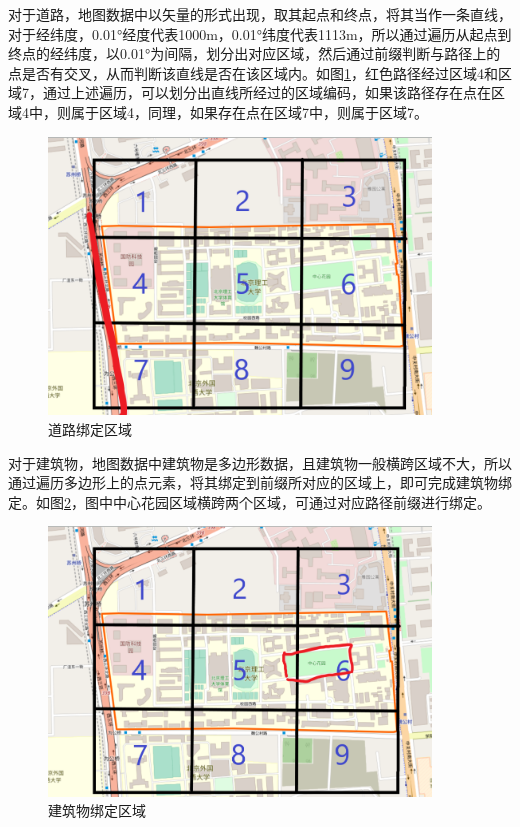 对于道路，地图数据中以矢量的形式出现，取其起点和终点，将其当作一条直线，对于经纬度，0.01°经度代表1000m，0.01°纬度代表1113m，所以通过遍历从起点到终点的经纬度，以0.01°为间隔，划分出对应区域，然后通过前缀判断与路径上的点是否有交叉，从而判断该直线是否在该区域内。如图\ref{道路绑定区域}，红色路径经过区域4和区域7，通过上述遍历，可以划分出直线所经过的区域编码，如果该路径存在点在区域4中，则属于区域4，同理，如果存在点在区域7中，则属于区域7。
\begin{figure}[H]
    \centering
    \includegraphics[width=4in]{images/4.png}
    \caption{道路绑定区域}\label{道路绑定区域} %
  \end{figure}

对于建筑物，地图数据中建筑物是多边形数据，且建筑物一般横跨区域不大，所以通过遍历多边形上的点元素，将其绑定到前缀所对应的区域上，即可完成建筑物绑定。如图\ref{建筑物绑定区域}，图中中心花园区域横跨两个区域，可通过对应路径前缀进行绑定。
\begin{figure}[H]
    \centering
    \includegraphics[width=4in]{images/5.png}
    \caption{建筑物绑定区域}\label{建筑物绑定区域} %
  \end{figure}

